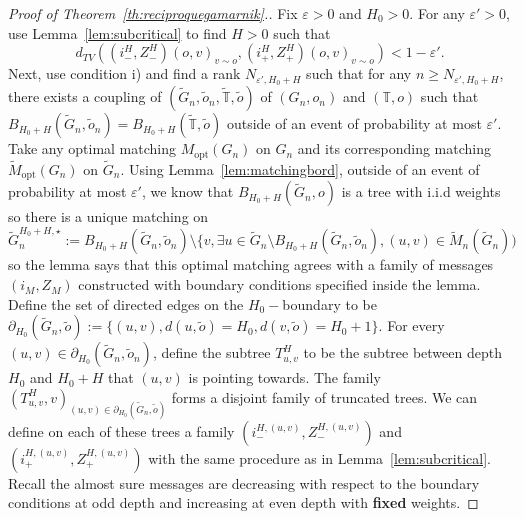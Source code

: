 \documentclass[11pt]{article}
\newcommand{\eps}{\varepsilon}
\begin{document}
\begin{proof}[Proof of Theorem~\ref{th:reciproquegamarnik}.]
Fix $\eps>0$ and $H_0>0$.
For any $\eps'>0$, use Lemma~\ref{lem:subcritical} to find $H>0$ such that \[d_{TV}((i_-^{H},Z_-^{H})(o,v)_{v \sim o}, (i_+^{H},Z_+^{H})(o,v)_{v \sim o})<1-\eps'.\]
Next, use condition i) and find a rank $N_{\eps',H_0+H}$ such that for any $n \geq N_{\eps',H_0+H}$, there exists a coupling of $(\tilde{G}_n,\tilde{o}_n,\tilde{\mathbb{T}},\tilde{o})$ of $(G_n,o_n)$ and $(\mathbb{T},o)$ such that $B_{H_0+H}(\tilde{G}_n,\tilde{o}_n)=B_{H_0+H}(\tilde{\mathbb{T}},\tilde{o})$ outside of an event of probability at most $\eps'$.
Take any optimal matching $M_{\mathrm{opt}}(G_n)$ on $G_n$ and its corresponding matching $\tilde{M}_{\mathrm{opt}}(G_n)$ on $\tilde{G}_n$. Using Lemma~\ref{lem:matchingbord}, outside of an event of probability at most $\eps'$, we know that $B_{H_0+H}(\tilde{G}_n,o)$ is a tree with i.i.d weights so there is a unique matching on \[\tilde{G}_n^{H_0+H,\star}:=B_{H_0+H}(\tilde{G}_n,\tilde{o}_n) \setminus \{v, \exists u \in \tilde{G}_n \setminus B_{H_0+H}(\tilde{G}_n,\tilde{o}_n), (u,v) \in \tilde{M}_n(\tilde{G}_n))\] so the lemma says that this optimal matching agrees with a family of messages $(i_M,Z_M)$ constructed with boundary conditions specified inside the lemma. 
Define the set of directed edges on the $H_0-$boundary to be $\partial_{H_0}(\tilde{G}_n,\tilde{o}):= \{(u,v), d(u,\tilde{o})=H_0, d(v,\tilde{o})=H_0+1\}$.
For every $(u,v) \in \partial_{H_0}(\tilde{G}_n,\tilde{o}_n)$, define the subtree $T_{u,v}^{H}$ to be the subtree between depth $H_0$ and $H_0+H$ that $(u,v)$ is pointing towards. The family $(T_{u,v}^{H},v)_{(u,v) \in \partial_{H_0}(\tilde{G}_n,\tilde{o})}$ forms a disjoint family of truncated trees. 
We can define on each of these trees a family $(i_-^{H,(u,v)},Z_-^{H,(u,v)})$ and $(i_+^{H,(u,v)},Z_+^{H,(u,v)})$ with the same procedure as in Lemma~\ref{lem:subcritical}.
Recall the almost sure messages are decreasing with respect to the boundary conditions at odd depth and increasing at even depth with \textbf{fixed} weights. 


\end{proof}
\end{document}
